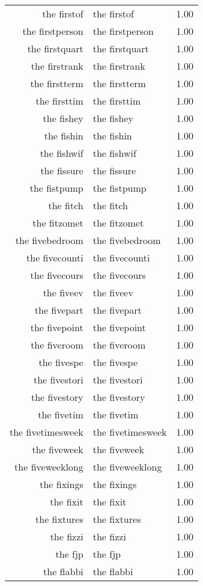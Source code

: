\begin{table}[ht]
\begin{tabular}{rlr}
  the firstof & the firstof & 1.00 \\ 
  the firstperson & the firstperson & 1.00 \\ 
  the firstquart & the firstquart & 1.00 \\ 
  the firstrank & the firstrank & 1.00 \\ 
  the firstterm & the firstterm & 1.00 \\ 
  the firsttim & the firsttim & 1.00 \\ 
  the fishey & the fishey & 1.00 \\ 
  the fishin & the fishin & 1.00 \\ 
  the fishwif & the fishwif & 1.00 \\ 
  the fissure & the fissure & 1.00 \\ 
  the fistpump & the fistpump & 1.00 \\ 
  the fitch & the fitch & 1.00 \\ 
  the fitzomet & the fitzomet & 1.00 \\ 
  the fivebedroom & the fivebedroom & 1.00 \\ 
  the fivecounti & the fivecounti & 1.00 \\ 
  the fivecours & the fivecours & 1.00 \\ 
  the fiveev & the fiveev & 1.00 \\ 
  the fivepart & the fivepart & 1.00 \\ 
  the fivepoint & the fivepoint & 1.00 \\ 
  the fiveroom & the fiveroom & 1.00 \\ 
  the fivespe & the fivespe & 1.00 \\ 
  the fivestori & the fivestori & 1.00 \\ 
  the fivestory & the fivestory & 1.00 \\ 
  the fivetim & the fivetim & 1.00 \\ 
  the fivetimesweek & the fivetimesweek & 1.00 \\ 
  the fiveweek & the fiveweek & 1.00 \\ 
  the fiveweeklong & the fiveweeklong & 1.00 \\ 
  the fixings & the fixings & 1.00 \\ 
  the fixit & the fixit & 1.00 \\ 
  the fixtures & the fixtures & 1.00 \\ 
  the fizzi & the fizzi & 1.00 \\ 
  the fjp & the fjp & 1.00 \\ 
  the flabbi & the flabbi & 1.00 \\ 

\end{tabular}
\end{table}

